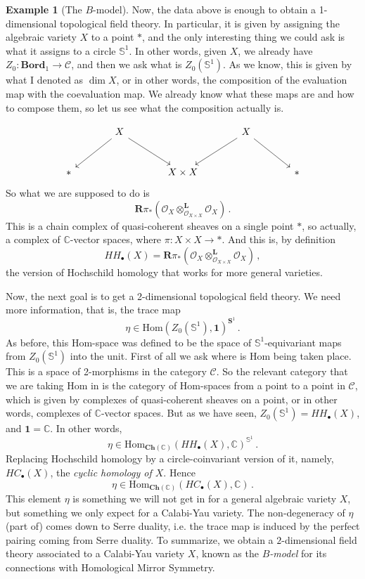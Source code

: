 \documentclass[a4paper,11pt]{article}
\newcommand{\Hom}{\mathrm{Hom}}
\newcommand{\ocal}{\mathscr{O}}
\newcommand{\ccal}{\mathcal{C}}
\theoremstyle{plain}
\theoremstyle{definition}
\newtheorem{ej}[thm]{Example}
\theoremstyle{remark}
\begin{document}
\begin{ej}[The $B$-model]
Now, the data above is enough to obtain a 1-dimensional topological field theory. In particular, it is given by assigning the algebraic variety $X$ to a point $*$, and the only interesting thing we could ask is what it assigns to a circle $\mathbb{S}^1$. In other words, given $X$, we already have $Z_0 \colon \textbf{Bord}_1 \to \ccal$, and then we ask what is $Z_0(\mathbb{S}^1)$. As we know, this is given by what I denoted as $\dim X$, or in other words, the composition of the evaluation map with the coevaluation map. We already know what these maps are and how to compose them, so let us see what the composition actually is.

\begin{equation*}
    \begin{tikzcd}[row sep = large, column sep = large]
    & X \arrow[ld] \arrow[rd]& & X \arrow[ld] \arrow[rd] &\\
    * & & X \times X & & *
    \end{tikzcd}
\end{equation*}
So what we are supposed to do is 
$$\mathbf{R}\pi_* (\ocal_X \otimes_{\ocal_{X \times X}}^{\mathbf{L}} \ocal_X) \, .$$
This is a chain complex of quasi-coherent sheaves on a single point $*$, so actually, a complex of $\mathbb{C}$-vector spaces, where $\pi \colon X \times X \to *$. And this is, by definition 
$$HH_{\bullet}(X) = \mathbf{R}\pi_* (\ocal_X \otimes_{\ocal_{X \times X}}^{\mathbf{L}} \ocal_X) \, ,$$
the  version of Hochschild homology that works for more general varieties. 

Now, the next goal is to get a 2-dimensional topological field theory. We need more information, that is, the trace map
$$\eta \in \Hom(Z_0(\mathbb{S}^1), \mathbf{1})^{\mathbf{S}^1} \, .$$
As before, this Hom-space was defined to be the space of $\mathbb{S}^1$-equivariant maps from $Z_0(\mathbb{S}^1)$ into the unit. First of all we ask where is $\Hom$ being taken place. This is a space of 2-morphisms in the category $\ccal$. So the relevant category that we are taking Hom in is the category of Hom-spaces from a point to a point in $\ccal$, which is given by complexes of quasi-coherent sheaves on a point, or in other words, complexes of $\mathbb{C}$-vector spaces. But as we have seen, $Z_0(\mathbb{S}^1) = HH_{\bullet}(X)$, and $\mathbf{1} = \mathbb{C}$. In other words, 
$$\eta \in \Hom_{\textbf{Ch}(\mathbb{C})}(HH_{\bullet}(X), \mathbb{C})^{\mathbb{S}^1} \, .$$
Replacing Hochschild homology by a circle-coinvariant version of it, namely, $HC_{\bullet}(X)$, the \textit{cyclic homology of $X$}. Hence 
$$\eta \in \Hom_{\textbf{Ch}(\mathbb{C})}(HC_{\bullet}(X), \mathbb{C}) \, .$$
This element $\eta$ is something we will not get in for a general algebraic variety $X$, but something we only expect for a Calabi-Yau variety. The non-degeneracy of $\eta$ (part of) comes down to Serre duality, i.e. the trace map is induced by the perfect pairing coming from Serre duality. To summarize, we obtain a $2$-dimensional field theory associated to a Calabi-Yau variety $X$, known as the \textit{$B$-model} for its connections with Homological Mirror Symmetry.  

\end{ej}
\end{document}
